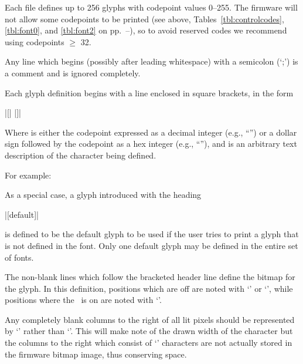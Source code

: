 Each file defines up to 256 glyphs with codepoint values 0--255. The firmware will not
allow some codepoints to be printed (see above, Tables~\ref{tbl:controlcodes}, \ref{tbl:font0}, and \ref{tbl:font2} on pp.~\pageref{tbl:controlcodes}--\pageref{tbl:font2}), so to avoid reserved codes we recommend using codepoints $\ge$ 32. 

Any line which begins (possibly after leading whitespace) with a semicolon (`\z;') is a comment and is ignored completely.

Each glyph definition begins with a line enclosed in square brackets, in the form
\begin{center}
	\begin{Coding}
		|[| |]|
	\end{Coding}
\end{center}
Where  is either the codepoint expressed as a decimal integer (e.g., ``'') or
a dollar sign followed by the codepoint as a hex integer (e.g., ``''), and
 is an arbitrary text description of the character being defined.

For example:

As a special case, a glyph introduced with the heading
\begin{center}
	\begin{Coding}
		|[default]|
	\end{Coding}
\end{center}
is defined to be the default glyph to be used if the user
tries to print a glyph that is not defined in the font. Only
one default glyph may be defined in the entire set of fonts.

The non-blank lines which follow the bracketed header line define
the bitmap for the glyph. In this definition, positions which are off
are noted with `' or `\z{|}', while positions where the \led\ is
on are noted with `'.

Any completely blank columns to the right of all lit pixels should be
represented by `\z{|}' rather than `'. This will make note of the drawn
width of the character but the columns to the right which consist of `\z{|}'
characters are not actually stored in the firmware bitmap image, thus conserving
 space.

